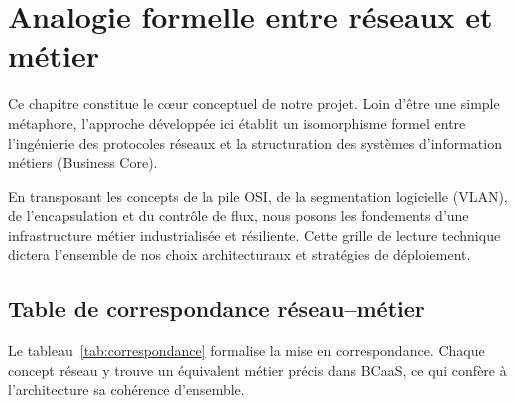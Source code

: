 \chapter{Analogie formelle entre réseaux et métier}
\label{chap:analogie}

Ce chapitre constitue le cœur conceptuel de notre projet. Loin d'être une simple métaphore, l'approche développée ici établit un isomorphisme formel entre l'ingénierie des protocoles réseaux et la structuration des systèmes d'information métiers (Business Core).


En transposant les concepts de la pile OSI, de la segmentation logicielle (VLAN), de l'encapsulation et du contrôle de flux, nous posons les fondements d'une infrastructure métier industrialisée et résiliente. Cette grille de lecture technique dictera l'ensemble de nos choix architecturaux et stratégies de déploiement.

\section{Table de correspondance réseau--métier}

Le tableau~\ref{tab:correspondance} formalise la mise en correspondance. Chaque concept
réseau y trouve un équivalent métier précis dans BCaaS, ce qui confère à l'architecture sa
cohérence d'ensemble.



